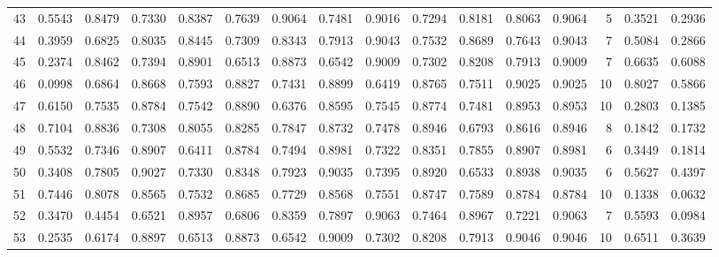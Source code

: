 \begin{tabular}{lrrrrrrrrrrrrrrr}
43  &      0.5543 &  0.8479 &  0.7330 &  0.8387 &  0.7639 &  0.9064 &  0.7481 &  0.9016 &  0.7294 &  0.8181 &   0.8063 &     0.9064 &      5 &                    0.3521 &                     0.2936 \\
44  &      0.3959 &  0.6825 &  0.8035 &  0.8445 &  0.7309 &  0.8343 &  0.7913 &  0.9043 &  0.7532 &  0.8689 &   0.7643 &     0.9043 &      7 &                    0.5084 &                     0.2866 \\
45  &      0.2374 &  0.8462 &  0.7394 &  0.8901 &  0.6513 &  0.8873 &  0.6542 &  0.9009 &  0.7302 &  0.8208 &   0.7913 &     0.9009 &      7 &                    0.6635 &                     0.6088 \\
46  &      0.0998 &  0.6864 &  0.8668 &  0.7593 &  0.8827 &  0.7431 &  0.8899 &  0.6419 &  0.8765 &  0.7511 &   0.9025 &     0.9025 &     10 &                    0.8027 &                     0.5866 \\
47  &      0.6150 &  0.7535 &  0.8784 &  0.7542 &  0.8890 &  0.6376 &  0.8595 &  0.7545 &  0.8774 &  0.7481 &   0.8953 &     0.8953 &     10 &                    0.2803 &                     0.1385 \\
48  &      0.7104 &  0.8836 &  0.7308 &  0.8055 &  0.8285 &  0.7847 &  0.8732 &  0.7478 &  0.8946 &  0.6793 &   0.8616 &     0.8946 &      8 &                    0.1842 &                     0.1732 \\
49  &      0.5532 &  0.7346 &  0.8907 &  0.6411 &  0.8784 &  0.7494 &  0.8981 &  0.7322 &  0.8351 &  0.7855 &   0.8907 &     0.8981 &      6 &                    0.3449 &                     0.1814 \\
50  &      0.3408 &  0.7805 &  0.9027 &  0.7330 &  0.8348 &  0.7923 &  0.9035 &  0.7395 &  0.8920 &  0.6533 &   0.8938 &     0.9035 &      6 &                    0.5627 &                     0.4397 \\
51  &      0.7446 &  0.8078 &  0.8565 &  0.7532 &  0.8685 &  0.7729 &  0.8568 &  0.7551 &  0.8747 &  0.7589 &   0.8784 &     0.8784 &     10 &                    0.1338 &                     0.0632 \\
52  &      0.3470 &  0.4454 &  0.6521 &  0.8957 &  0.6806 &  0.8359 &  0.7897 &  0.9063 &  0.7464 &  0.8967 &   0.7221 &     0.9063 &      7 &                    0.5593 &                     0.0984 \\
53  &      0.2535 &  0.6174 &  0.8897 &  0.6513 &  0.8873 &  0.6542 &  0.9009 &  0.7302 &  0.8208 &  0.7913 &   0.9046 &     0.9046 &     10 &                    0.6511 &                     0.3639 \\

\end{tabular}
